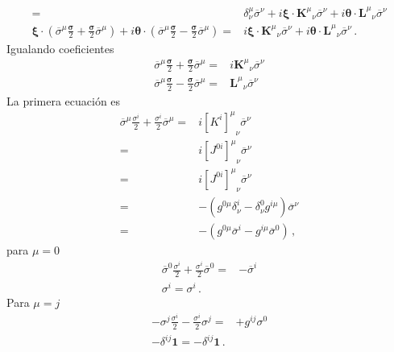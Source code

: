 \begin{frame}
\begin{align*}
 =&\delta^{\mu}_{\nu}\overline{\sigma}^\nu+i\boldsymbol{\xi}\cdot {\boldsymbol{K}^{\mu}}_{\nu}\overline{\sigma}^\nu+i\boldsymbol{\theta}\cdot {\boldsymbol{L}^{\mu}}_{\nu}\overline{\sigma}^\nu \nonumber\\
  \boldsymbol{\xi}\cdot \left(\overline{\sigma}^{\mu}\frac{\boldsymbol{\sigma}}{2}+ \frac{\boldsymbol{\sigma}}{2}\overline{\sigma}^{\mu}\right)  +i\boldsymbol{\theta}\cdot \left(\overline{\sigma}^{\mu} \frac{\boldsymbol{\sigma}}{2}-\frac{\boldsymbol{\sigma}}{2}\overline{\sigma}^{\mu} \right)  
 =&i\boldsymbol{\xi}\cdot {\boldsymbol{K}^{\mu}}_{\nu}\overline{\sigma}^\nu+i\boldsymbol{\theta}\cdot {\boldsymbol{L}^{\mu}}_{\nu}\overline{\sigma}^\nu\,.
\end{align*}
Igualando coeficientes
\begin{align*}
\overline{\sigma}^{\mu}\frac{\boldsymbol{\sigma}}{2}+ \frac{\boldsymbol{\sigma}}{2}\overline{\sigma}^{\mu}  =&i{\boldsymbol{K}^{\mu}}_{\nu}\overline{\sigma}^\nu \nonumber\\
\overline{\sigma}^{\mu} \frac{\boldsymbol{\sigma}}{2}-\frac{\boldsymbol{\sigma}}{2}\overline{\sigma}^{\mu}=&
{\boldsymbol{L}^{\mu}}_{\nu}\overline{\sigma}^\nu
\end{align*}
La primera ecuación es
\begin{align*}
  \overline{\sigma}^{\mu}\frac{\sigma^i}{2} +\frac{\sigma^i}{2}\overline{\sigma}^{\mu}  =&i{\left[ K^i \right]^{\mu}}_{\nu}\overline{\sigma}^\nu \nonumber\\
 =&i{\left[ J^{0i} \right]^{\mu}}_{\nu}\overline{\sigma}^\nu \nonumber\\
  =&i{\left[ J^{0i} \right]^{\mu}}_{\nu}\overline{\sigma}^\nu \nonumber\\
  =&-\left(g^{0\mu}\delta^i_{\nu} -\delta^0_{\nu}g^{i\mu}  \right)\overline{\sigma}^\nu \nonumber\\
  =&-\left(g^{0\mu}\overline{\sigma}^i -g^{i\mu} \overline{\sigma}^0  \right)\,,
\end{align*}
para $\mu=0$
\begin{align*}
  \overline{\sigma}^{0}\frac{\sigma^i}{2} +\frac{\sigma^i}{2}\overline{\sigma}^{0}=&-\overline{\sigma}^i \nonumber\\
  \sigma^i=\sigma^i\,.
\end{align*}
Para $\mu=j$
\begin{align*}
  -\sigma^{j}\frac{\sigma^i}{2} -\frac{\sigma^i}{2}\sigma^j  =& +g^{ij}\sigma^0\nonumber\\
  -\delta^{ij}\boldsymbol{1}=-\delta^{ij}\boldsymbol{1}\,.
\end{align*}

\end{frame}
